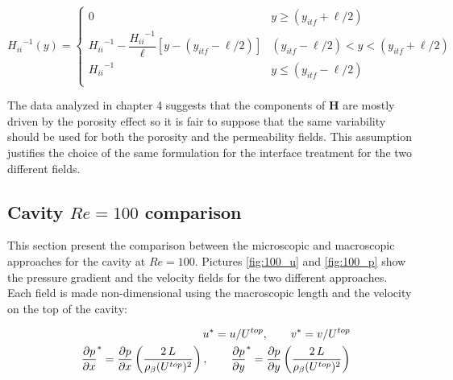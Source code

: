 \begin{equation}
{H_{ii}}^{-1}(y) = 
\begin{cases}
0 & y\geqslant(y_{itf}+\ell/2) \\
{H_{ii}}^{-1} - \dfrac{{H_{ii}}^{-1}}{\ell}\left[y -\left(y_{itf} -\ell/2\right)\right] &  (y_{itf}-\ell/2)<y<(y_{itf}+\ell/2)\\
{H_{ii}}^{-1} &y\leqslant(y_{itf}-\ell/2) \\
\end{cases}
\label{eq:permeability_fun}
\end{equation}

The data analyzed in chapter 4 suggests that the components of $\mathbf{H}$ are mostly driven by the porosity effect so it is fair to suppose that the same variability should be used for both the porosity and the permeability fields. This assumption justifies the choice of the same formulation for the interface treatment for the two different fields.

\subsection{Cavity $Re=100$ comparison}

This section present the comparison between the microscopic and macroscopic approaches for the cavity at $Re=100$. Pictures \ref{fig:100_u} and \ref{fig:100_p} show the pressure gradient and the velocity fields for the two different approaches.
Each field is made non-dimensional using the macroscopic length and the velocity on the top of the cavity:

\begin{eqnarray}
&& u^* = u/{U^{top}}, \qquad v^* = v/{U^{top}} \nonumber \\
&& \dfrac{\partial p}{\partial x}^* = \dfrac{\partial p}{\partial x}  \left(\dfrac{2 \, L}{ \rho_{\beta} {(U^{top})^2 }}   \right), \qquad \dfrac{\partial p}{\partial y}^* = \dfrac{\partial p}{\partial y}  \left(\dfrac{2 \, L}{ \rho_{\beta} {(U^{top})^2 }}   \right) \nonumber
\end{eqnarray}


